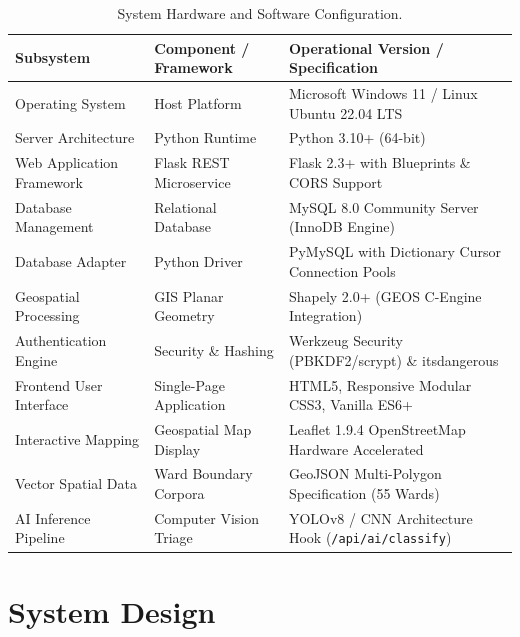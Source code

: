 \documentclass[12pt,a4paper]{report}
\begin{document}
\begin{table}[H]
\centering
\begin{singlespace}
\caption{System Hardware and Software Configuration.}
\label{tab:tech_stack_spec}
\footnotesize
\renewcommand{\arraystretch}{1.15}
\begin{tabularx}{\textwidth}{>{\raggedright\arraybackslash}p{3.2cm} >{\raggedright\arraybackslash}p{4.2cm} >{\raggedright\arraybackslash}X}
\toprule
\textbf{Subsystem} & \textbf{Component / Framework} & \textbf{Operational Version / Specification} \\
\midrule
Operating System & Host Platform & Microsoft Windows 11 / Linux Ubuntu 22.04 LTS \\
Server Architecture & Python Runtime & Python 3.10+ (64-bit) \\
Web Application Framework & Flask REST Microservice & Flask 2.3+ with Blueprints \& CORS Support \\
Database Management & Relational Database & MySQL 8.0 Community Server (InnoDB Engine) \\
Database Adapter & Python Driver & PyMySQL with Dictionary Cursor Connection Pools \\
Geospatial Processing & GIS Planar Geometry & Shapely 2.0+ (GEOS C-Engine Integration) \\
Authentication Engine & Security \& Hashing & Werkzeug Security (PBKDF2/scrypt) \& itsdangerous \\
Frontend User Interface & Single-Page Application & HTML5, Responsive Modular CSS3, Vanilla ES6+ \\
Interactive Mapping & Geospatial Map Display & Leaflet 1.9.4 OpenStreetMap Hardware Accelerated \\
Vector Spatial Data & Ward Boundary Corpora & GeoJSON Multi-Polygon Specification (55 Wards) \\
AI Inference Pipeline & Computer Vision Triage & YOLOv8 / CNN Architecture Hook (\texttt{/api/ai/classify}) \\
\bottomrule
\end{tabularx}
\end{singlespace}
\end{table}


\chapter{System Design}
\end{document}
